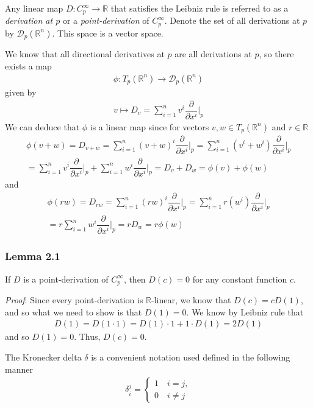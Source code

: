 \documentclass{article}
\newcommand{\R}{\mathbb{R}}
\newcommand{\Cinfty}{C^{\infty}}
\begin{document}
	Any linear map $D: \Cinfty_p \to \R$ that satisfies the Leibniz rule is referred to as a \textit{derivation at $p$} or a \textit{point-derivation} of $\Cinfty_p$. Denote the set of all derivations at $p$ by $\mathcal{D}_p(\R^n)$. This space is a vector space.
	
	We know that all directional derivatives at $p$ are all derivations at $p$, so there exists a map
	\begin{gather*}
		\phi: T_p (\R^n) \to \mathcal{D}_p(\R^n)
	\end{gather*}
	given by
	\begin{gather*}
		v \mapsto D_v = \sum_{i = 1}^n v^i \dfrac{\partial}{\partial x^i} \Bigg|_p
	\end{gather*}
	We can deduce that $\phi$ is a linear map since for vectors $v, w \in T_p (\R^n)$ and $r \in \R$
	\begin{gather*}
		\phi(v + w) = D_{v + w} = \sum_{i = 1}^n (v + w)^i \dfrac{\partial}{\partial x^i} \Bigg|_p = \sum_{i = 1}^n (v^i + w^i) \dfrac{\partial}{\partial x^i} \Bigg|_p \\
		= \sum_{i = 1}^n v^i \dfrac{\partial}{\partial x^i} \Bigg|_p + \sum_{i = 1}^n w^i \dfrac{\partial}{\partial x^i} \Bigg|_p = D_v + D_w = \phi(v) + \phi(w)
	\end{gather*}
	and
	\begin{gather*}
		\phi(rw) = D_{rw} = \sum_{i = 1}^n (rw)^i \dfrac{\partial}{\partial x^i} \Bigg|_p = \sum_{i = 1}^n r(w^i) \dfrac{\partial}{\partial x^i} \Bigg|_p \\
		= r \sum_{i = 1}^n w^i \dfrac{\partial}{\partial x^i} \Bigg|_p = r D_w = r \phi(w)
	\end{gather*}
	
	\subsubsection*{Lemma 2.1}
	If $D$ is a point-derivation of $\Cinfty_p$, then $D(c) = 0$ for any constant function $c$.
	
	\noindent \textit{Proof}: Since every point-derivation is $\R$-linear, we know that $D(c) = cD(1)$, and so what we need to show is that $D(1) = 0$. We know by Leibniz rule that
	\begin{gather*}
		D(1) = D(1 \cdot 1) = D(1) \cdot 1 + 1 \cdot D(1) = 2D(1)
	\end{gather*}
	and so $D(1) = 0$. Thus, $D(c) = 0$.
	
	The Kronecker delta $\delta$ is a convenient notation used defined in the following manner
	\begin{gather*}
		\delta_i^j = \begin{cases}
			1 \quad i = j, \\
			0 \quad i \neq j
		\end{cases}
	\end{gather*}
	
\end{document}

